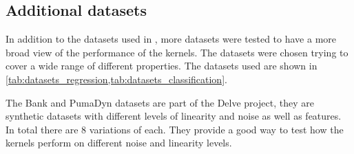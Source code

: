 \subsection{Additional datasets}%

In addition to the datasets used in \cite{frenayParameterinsensitiveKernelExtreme2011},
more datasets were tested to have a more broad view of the performance of the
kernels. The datasets were chosen trying to cover a wide range of different
properties. The datasets used are shown in \cref{tab:datasets_regression,tab:datasets_classification}.


The Bank and PumaDyn datasets are part of the Delve project, they are synthetic
datasets with different levels of linearity and noise as well as features. In total
there are 8 variations of each. They provide a good way to test how the kernels
perform on different noise and linearity levels.

